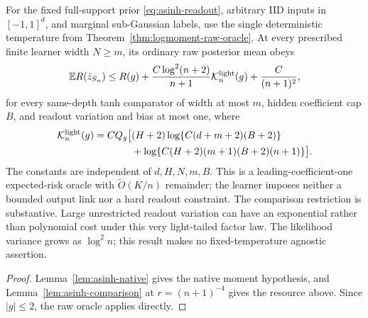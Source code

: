 \begin{corollary}
\label{cor:asinh-neural}
For the fixed full-support prior \eqref{eq:asinh-readout}, arbitrary
IID inputs in $[-1,1]^d$, and marginal sub-Gaussian labels, use the
single deterministic temperature from
Theorem~\ref{thm:logmoment-raw-oracle}.
At every prescribed finite learner width $N\ge m$, its ordinary raw
posterior mean obeys
\[
 \mathbb E R(\bar z_{S_n})\le R(g)+
       \frac{C\log^2(n+2)}{n+1}\mathcal K_n^{\rm light}(g)
                     +\frac C{(n+1)^2},
\]
for every same-depth tanh comparator of width at most $m$, hidden
coefficient cap $B$, and readout variation and bias at most one, where
\begin{align*}
 \mathcal K_n^{\rm light}(g)=C Q_g\big[&(H+2)
          \log\{C(d+m+2)(B+2)\}\\
       &+\log\{C(H+2)(m+1)(B+2)(n+1)\}\big].
\end{align*}
The constants are independent of $d,H,N,m,B$.
This is a leading-coefficient-one expected-risk oracle with
$\widetilde O(K/n)$ remainder; the learner imposes neither a bounded
output link nor a hard readout constraint. The comparison restriction
is substantive. Large unrestricted readout variation can have an
exponential rather than polynomial cost under this very light-tailed
factor law. The likelihood variance grows as $\log^2 n$; this result
makes no fixed-temperature agnostic assertion.
\end{corollary}
\begin{proof}
Lemma~\ref{lem:asinh-native} gives the native moment hypothesis,
and Lemma~\ref{lem:asinh-comparison} at $r=(n+1)^{-4}$ gives the
resource above. Since $|g|\le2$, the raw oracle applies directly.
\end{proof}
